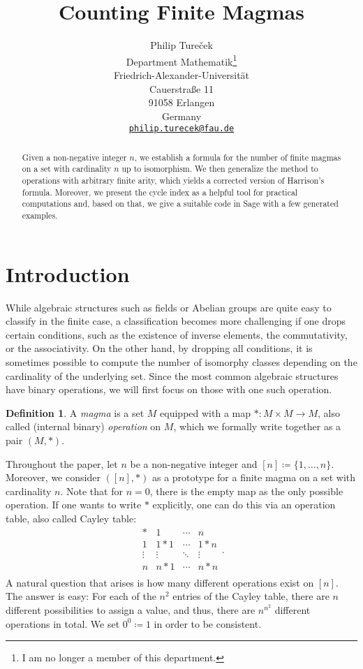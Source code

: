 \documentclass[12pt]{article}
\title{\bf Counting Finite Magmas}
\date{}
\author{
Philip Ture\v{c}ek\\
Department Mathematik\thanks{I am no longer a member of this department.}\\
Friedrich-Alexander-Universit\"at\\
Cauerstra{\ss}e 11\\
91058 Erlangen\\
Germany\\
\href{mailto:philip.turecek@fau.de}{\tt philip.turecek@fau.de}
}
\theoremstyle{definition}
\newtheorem{definition}[theorem]{Definition}
\theoremstyle{remark}
\begin{document}
	\maketitle
	\begin{abstract}
		Given a non-negative integer $n$, we establish a formula for the number of finite magmas on a set with cardinality $n$ up to isomorphism. We then generalize the method to operations with arbitrary finite arity, which yields a corrected version of Harrison's formula. Moreover, we present the cycle index as a helpful tool for practical computations and, based on that, we give a suitable code in Sage with a few generated examples.
	\end{abstract}
	
	\section{Introduction}
	While algebraic structures such as fields or Abelian groups are quite easy to classify in the finite case, a classification becomes more challenging if one drops certain conditions, such as the existence of inverse elements, the commutativity, or the associativity. On the other hand, by dropping all conditions, it is sometimes possible to compute the number of isomorphy classes depending on the cardinality of the underlying set. Since the most common algebraic structures have binary operations, we will first focus on those with one such operation.
	\begin{definition}
		A \emph{magma} is a set $M$ equipped with a map $\ast \colon M \times M \to M$, also called (internal binary) \emph{operation} on $M$, which we formally write together as a pair $(M,\ast)$.
	\end{definition}

	Throughout the paper, let $n$ be a non-negative integer and $[n] \coloneqq \{1,\dots,n\}$. Moreover, we consider $([n],\ast)$ as a prototype for a finite magma on a set with cardinality $n$. Note that for $n=0$, there is the empty map as the only possible operation. If one wants to write $\ast$ explicitly, one can do this via an operation table, also called Cayley table:
	\[
	\begin{array}{c|ccc}
		\ast & 1 & \cdots & n \\ \hline
		1 & 1\ast1 & \cdots & 1\ast n \\ 
		\vdots & \vdots & \ddots & \vdots \\
		n & n\ast1 & \cdots & n\ast n \\
	\end{array}.
	\]
	A natural question that arises is how many different operations exist on $[n]$. The answer is easy: For each of the $n^2$ entries of the Cayley table, there are $n$ different possibilities to assign a value, and thus, there are $n^{n^2}$ different operations in total. We set $0^0\coloneqq1$ in order to be consistent.
\end{document}
